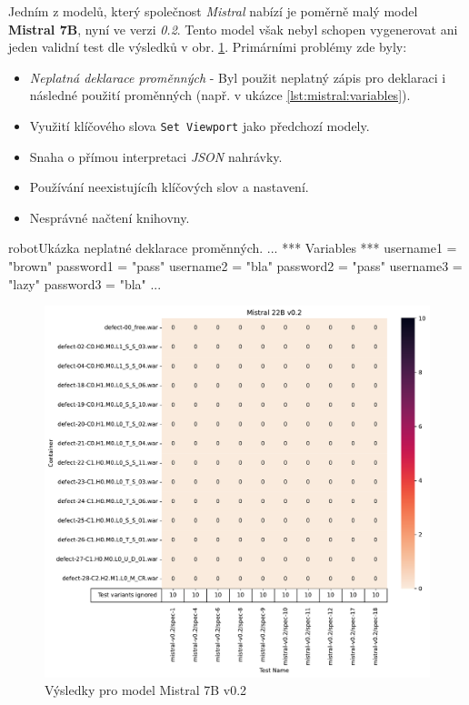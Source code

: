 \documentclass[czech, ma, kiv, he, iso690numb, pdf, viewonly]{fasthesis}
\begin{document}
        Jedním z modelů, který společnost \textit{Mistral} nabízí je poměrně malý model \textbf{Mistral 7B}, nyní ve verzi \textit{0.2}. Tento model však nebyl schopen vygenerovat ani jeden validní test dle výsledků v obr. \ref{fig:res:mistral-7b}. Primárními problémy zde byly:
        \begin{itemize}
            \item \emph{Neplatná deklarace proměnných} - Byl použit neplatný zápis pro deklaraci i následné použití proměnných (např. v ukázce \ref{lst:mistral:variables}).
            \item Využití klíčového slova \verb|Set Viewport| jako předchozí modely.
            \item Snaha o přímou interpretaci \textit{JSON} nahrávky.
            \item Používání neexistujícíh klíčových slov a nastavení.
            \item Nesprávné načtení knihovny.
        \end{itemize}

        \begin{code}{robot}{Ukázka neplatné deklarace proměnných. \label{lst:mistral:variables}}
...
*** Variables ***
username1 = "brown"
password1 = "pass"
username2 = "bla"
password2 = "pass"
username3 = "lazy"
password3 = "bla"
...
        \end{code}

        \begin{figure}
            \includegraphics[width=\textwidth]{pic/mistral-v0.2-res.pdf}
            \caption{Výsledky pro model Mistral 7B v0.2}
            \label{fig:res:mistral-7b}
        \end{figure}
\end{document}
